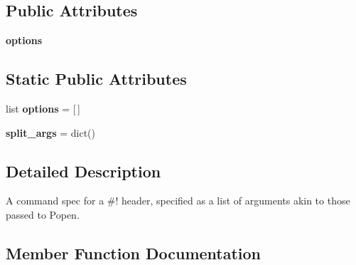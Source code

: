 \subsection*{Public Attributes}
\begin{DoxyCompactItemize}
\item 
\mbox{\label{classsetuptools_1_1command_1_1easy__install_1_1_command_spec_af903823d2b8b78c41780cdf6268bd81e}} 
{\bfseries options}
\end{DoxyCompactItemize}
\subsection*{Static Public Attributes}
\begin{DoxyCompactItemize}
\item 
\mbox{\label{classsetuptools_1_1command_1_1easy__install_1_1_command_spec_a58015e2b0bfa19cf426a628dd511b589}} 
list {\bfseries options} = \mbox{[}$\,$\mbox{]}
\item 
\mbox{\label{classsetuptools_1_1command_1_1easy__install_1_1_command_spec_ad018294d1fc138784632eceabaf1aa48}} 
{\bfseries split\+\_\+args} = dict()
\end{DoxyCompactItemize}


\subsection{Detailed Description}
\begin{DoxyVerb}A command spec for a #! header, specified as a list of arguments akin to
those passed to Popen.
\end{DoxyVerb}
 

\subsection{Member Function Documentation}
\mbox{\label{classsetuptools_1_1command_1_1easy__install_1_1_command_spec_ac2ba0db896d483306a07e374489f412f}} 
